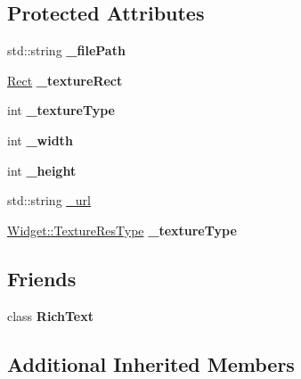 \subsection*{Protected Attributes}
\begin{DoxyCompactItemize}
\item 
\mbox{\label{classui_1_1RichElementImage_aaa2efd85ae2bcc0231777bd6b806992e}} 
std\+::string {\bfseries \+\_\+file\+Path}
\item 
\mbox{\label{classui_1_1RichElementImage_aef0ef29b9ab62d14208b5c29efee6fbf}} 
\hyperlink{classRect}{Rect} {\bfseries \+\_\+texture\+Rect}
\item 
\mbox{\label{classui_1_1RichElementImage_ae1681bc3ced4668fdf6d89ad5ab694c0}} 
int {\bfseries \+\_\+texture\+Type}
\item 
\mbox{\label{classui_1_1RichElementImage_a892900407346ff40938500526ae4a34d}} 
int {\bfseries \+\_\+width}
\item 
\mbox{\label{classui_1_1RichElementImage_a9162ad7fc5a52f9890252abc893bfa79}} 
int {\bfseries \+\_\+height}
\item 
std\+::string \hyperlink{classui_1_1RichElementImage_a27ed5fc7ec3624948ac4fe5bb8064537}{\+\_\+url}
\item 
\mbox{\label{classui_1_1RichElementImage_aa7872d0b2b9b214e79268aa8a2060a2a}} 
\hyperlink{classui_1_1Widget_a040a65ec5ad3b11119b7e16b98bd9af0}{Widget\+::\+Texture\+Res\+Type} {\bfseries \+\_\+texture\+Type}
\end{DoxyCompactItemize}
\subsection*{Friends}
\begin{DoxyCompactItemize}
\item 
\mbox{\label{classui_1_1RichElementImage_a0e450ad30cc76fbbd86270e035cc8790}} 
class {\bfseries Rich\+Text}
\end{DoxyCompactItemize}
\subsection*{Additional Inherited Members}


